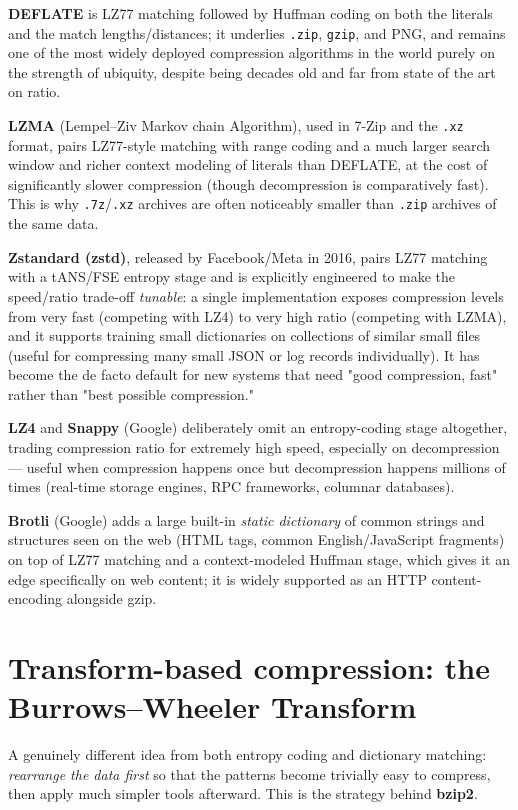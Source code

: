 \documentclass[11pt]{article}
\begin{document}
\textbf{DEFLATE} is LZ77 matching followed by Huffman coding on both the literals and the match lengths/distances; it underlies \texttt{.zip}, \texttt{gzip}, and PNG, and remains one of the most widely deployed compression algorithms in the world purely on the strength of ubiquity, despite being decades old and far from state of the art on ratio.

\textbf{LZMA} (Lempel--Ziv Markov chain Algorithm), used in 7-Zip and the \texttt{.xz} format, pairs LZ77-style matching with range coding and a much larger search window and richer context modeling of literals than DEFLATE, at the cost of significantly slower compression (though decompression is comparatively fast). This is why \texttt{.7z}/\texttt{.xz} archives are often noticeably smaller than \texttt{.zip} archives of the same data.

\textbf{Zstandard (zstd)}, released by Facebook/Meta in 2016, pairs LZ77 matching with a tANS/FSE entropy stage and is explicitly engineered to make the speed/ratio trade-off \emph{tunable}: a single implementation exposes compression levels from very fast (competing with LZ4) to very high ratio (competing with LZMA), and it supports training small dictionaries on collections of similar small files (useful for compressing many small JSON or log records individually). It has become the de facto default for new systems that need "good compression, fast" rather than "best possible compression."

\textbf{LZ4} and \textbf{Snappy} (Google) deliberately omit an entropy-coding stage altogether, trading compression ratio for extremely high speed, especially on decompression — useful when compression happens once but decompression happens millions of times (real-time storage engines, RPC frameworks, columnar databases).

\textbf{Brotli} (Google) adds a large built-in \emph{static dictionary} of common strings and structures seen on the web (HTML tags, common English/JavaScript fragments) on top of LZ77 matching and a context-modeled Huffman stage, which gives it an edge specifically on web content; it is widely supported as an HTTP content-encoding alongside gzip.

\section{Transform-based compression: the Burrows--Wheeler Transform}

A genuinely different idea from both entropy coding and dictionary matching: \emph{rearrange the data first} so that the patterns become trivially easy to compress, then apply much simpler tools afterward. This is the strategy behind \textbf{bzip2}.
\end{document}
